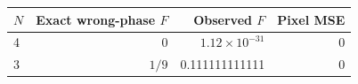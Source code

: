 \begin{center}
{\small
\setlength{\tabcolsep}{4pt}
\begin{tabular}{@{}lrrr@{}}
\toprule
$N$ & Exact wrong-phase $F$ & Observed $F$ & Pixel MSE \\
\midrule
4 & 0 & $1.12\times10^{-31}$ & 0 \\
3 & $1/9$ & 0.111111111111 & 0 \\
\bottomrule
\end{tabular}}
\end{center}
